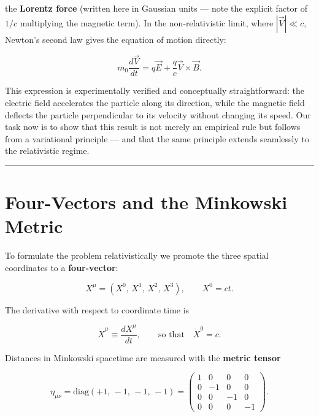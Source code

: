 the \textbf{Lorentz force} (written here in Gaussian units --- note the explicit factor of $1/c$ multiplying the magnetic term). In the non-relativistic limit, where $|\vec{V}| \ll c$, Newton's second law gives the equation of motion directly:

\begin{equation}
m_0 \frac{d\vec{V}}{dt} = q\vec{E} + \frac{q}{c}\vec{V} \times \vec{B}.
\end{equation}

This expression is experimentally verified and conceptually straightforward: the electric field accelerates the particle along its direction, while the magnetic field deflects the particle perpendicular to its velocity without changing its speed. Our task now is to show that this result is not merely an empirical rule but follows from a variational principle --- and that the same principle extends seamlessly to the relativistic regime.

\hrule
\vspace{1em}

\section{Four-Vectors and the Minkowski Metric}

To formulate the problem relativistically we promote the three spatial coordinates to a \textbf{four-vector}:

\begin{equation}
X^\mu = (X^0,\, X^1,\, X^2,\, X^3), \qquad X^0 = ct.
\end{equation}

The derivative with respect to coordinate time is

\begin{equation}
\dot{X}^\mu \equiv \frac{dX^\mu}{dt}, \qquad \text{so that} \quad \dot{X}^0 = c.
\end{equation}

Distances in Minkowski spacetime are measured with the \textbf{metric tensor}

\begin{equation}
\eta_{\mu\nu} = \text{diag}(+1,\,-1,\,-1,\,-1) = \begin{pmatrix} 1 & 0 & 0 & 0 \\ 0 & -1 & 0 & 0 \\ 0 & 0 & -1 & 0 \\ 0 & 0 & 0 & -1 \end{pmatrix}.
\end{equation}

